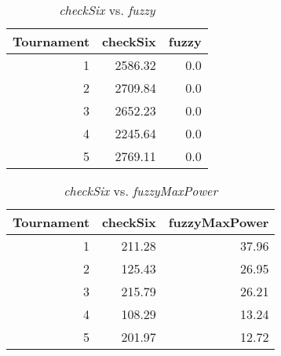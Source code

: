 \begin{table}[H]
\centering
\caption{\emph{checkSix} vs. \emph{fuzzy}}
\label{checkSix vs. fuzzy}
\begin{tabular}{r|r|r}
Tournament	& checkSix	& fuzzy	\\ \hline
1			& 2586.32	& 0.0	\\
2			& 2709.84	& 0.0	\\
3			& 2652.23	& 0.0	\\
4			& 2245.64	& 0.0	\\
5			& 2769.11	& 0.0
\end{tabular}
\end{table}

\begin{table}[H]
\centering
\caption{\emph{checkSix} vs. \emph{fuzzyMaxPower}}
\label{checkSix vs. fuzzyMaxPower}
\begin{tabular}{r|r|r}
Tournament	& checkSix	& fuzzyMaxPower	\\ \hline
1			& 211.28	& 37.96			\\
2			& 125.43	& 26.95			\\
3			& 215.79	& 26.21			\\
4			& 108.29	& 13.24			\\
5			& 201.97	& 12.72
\end{tabular}
\end{table}